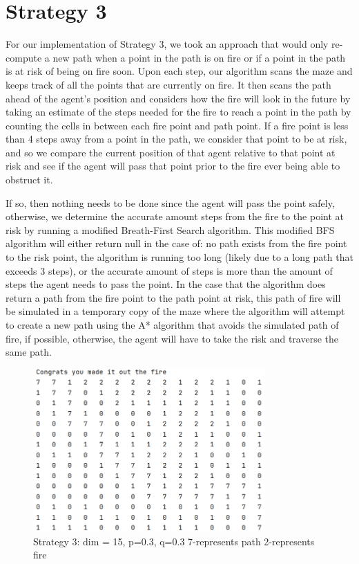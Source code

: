 \documentclass{article}
\begin{document}
\section{Strategy 3}
For our implementation of Strategy 3, we took an approach that would only re-compute a new path when a point in the path is on fire or if a point in the path is at risk of being on fire soon. Upon each step, our algorithm scans the maze and keeps track of all the points that are currently on fire. It then scans the path ahead of the agent’s position and considers how the fire will look in the future by taking an estimate of the steps needed for the fire to reach a point in the path by counting the cells in between each fire point and path point. If a fire point is less than 4 steps away from a point in the path, we consider that point to be at risk, and so we compare the current position of that agent relative to that point at risk and see if the agent will pass that point prior to the fire ever being able to obstruct it. 
	
	If so, then nothing needs to be done since the agent will pass the point safely, otherwise, we determine the accurate amount steps from the fire to the point at risk by running a modified Breath-First Search algorithm. This modified BFS algorithm will either return null in the case of: no path exists from the fire point to the risk point, the algorithm is running too long (likely due to a long path that exceeds 3 steps), or the accurate amount of steps is more than the amount of steps the agent needs to pass the point. In the case that the algorithm does return a path from the fire point to the path point at risk, this path of fire will be simulated in a temporary copy of the maze where the algorithm will attempt to create a new path using the A* algorithm that avoids the simulated path of fire, if possible, otherwise, the agent will have to take the risk and traverse the same path.  
   
   \begin{figure}[hpt]
   \centering
\includegraphics[width=3.5in]{strat3ex}

\caption{Strategy 3: dim = 15, p=0.3, q=0.3
7-represents path 2-represents fire}
\label{fig:figure6}
\end{figure}
\end{document}
